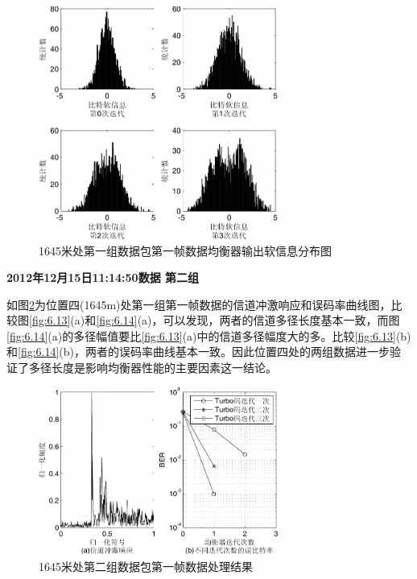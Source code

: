 \begin{figure}[htb]
  \begin{center}
    \includegraphics[width=0.7\textwidth]{images/softInfo_4_1.pdf}
  \end{center}
  \caption{1645米处第一组数据包第一帧数据均衡器输出软信息分布图}
  \label{fig:6.15s}
\end{figure}

\textbf{\sihao 2012年12月15日11:14:50数据 第二组} 

如图\ref{fig:6.16}为位置四(1645m)处第一组第一帧数据的信道冲激响应和误码率曲线图，比较图\ref{fig:6.13}(a)和\ref{fig:6.14}(a)，可以发现，两者的信道多径长度基本一致，而图\ref{fig:6.14}(a)的多径幅值要比\ref{fig:6.13}(a)中的信道多径幅度大的多。比较\ref{fig:6.13}(b)和\ref{fig:6.14}(b)，两者的误码率曲线基本一致。因此位置四处的两组数据进一步验证了多径长度是影响均衡器性能的主要因素这一结论。

\begin{figure}[htb]
  \begin{center}
    \includegraphics[width=0.7\textwidth]{images/result_4_2_s.pdf}
  \end{center}
  \caption{1645米处第二组数据包第一帧数据处理结果}
  \label{fig:6.16}
\end{figure}

